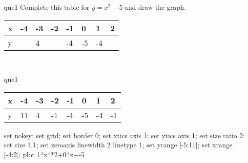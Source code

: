 \documentclass[13.5pt, varwidth=true]{beamer}
\begin{document}
\begin{frame}[shrink=19,fragile]
	\begin{beamercolorbox}[rounded=true, left, shadow=true,wd=14.8cm]{que1}
		 Complete this table for $y = x^{2} - 5$ and draw the graph. \\[0.3cm] \renewcommand{\arraystretch}{1.2}\begin{tabular}{|C|C|C|C|C|C|C|C|} \hline x & -4 & -3 & -2 & -1 & 0 & 1 & 2 \\ \hline y &  & 4 &  & -4 & -5 & -4 & \\ \hline \end{tabular}\\[0.3cm]
	\end{beamercolorbox}
\end{frame}
\begin{frame}[shrink=19,fragile]
	\begin{beamercolorbox}[rounded=true, left, shadow=true,wd=14.8cm]{que1}
		\renewcommand{\arraystretch}{1.2}\begin{tabular}{|C|C|C|C|C|C|C|C|} \hline x & -4 & -3 & -2 & -1 & 0 & 1 & 2 \\ \hline y & 11 & 4 & -1 & -4 & -5 & -4 & -1\\ \hline \end{tabular}\begin{gnuplot}[terminal=pdf] set nokey; set grid; set border 0; set xtics axis 1; set ytics axis 1; set size ratio 2; set size 1,1; set zeroaxis linewidth 2 linetype 1; set yrange [-5:11]; set xrange [-4:2]; plot 1*x**2+0*x+-5 \end{gnuplot}
	\end{beamercolorbox}
\end{frame}
\end{document}
